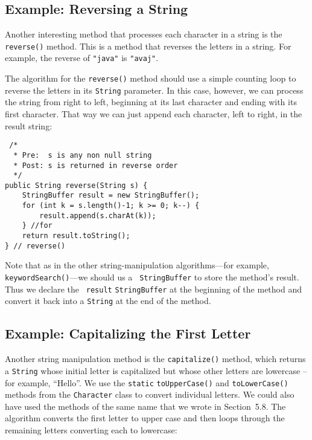 \subsection{Example: Reversing a String}
\noindent Another interesting method that processes each character in
a string is the {\tt reverse()} method. This is a method that reverses
the letters in a string. For example, the reverse of {\tt "java"} is
{\tt "avaj"}.  

The algorithm for the {\tt reverse()} method should use a simple
 counting loop to reverse the letters in
its {\tt String} parameter.  In this case, however, we can process the
string from right to left, beginning at its last character and ending
with its first character.  That way we can just append each character,
left to right, in the result string:   

\begin{jjjlisting}
\begin{lstlisting}
 /*
  * Pre:  s is any non null string
  * Post: s is returned in reverse order
  */
public String reverse(String s) {
    StringBuffer result = new StringBuffer();
    for (int k = s.length()-1; k >= 0; k--) {
        result.append(s.charAt(k));
    } //for
    return result.toString();
} // reverse()
\end{lstlisting}
\end{jjjlisting}

\noindent Note that as in the other string-manipulation
algorithms---for example, {\tt keywordSearch()}---we should us a {\tt
StringBuffer} to store the method's result.  Thus we declare the {\tt
result} {\tt StringBuffer} at the beginning of the method and convert
it back into a {\tt String} at the end of the method.


\subsection{Example: Capitalizing the First Letter }
\noindent Another string manipulation method is
the {\tt capitalize()} method, which returns a {\tt String} whose
initial letter is capitalized but whose other letters are lowercase --
for example, ``Hello''.  We use the {\tt static} {\tt toUpperCase()}
and {\tt toLowerCase()} methods from the {\tt Character} class to
convert individual letters.  We could also have used the methods of
the same name that we wrote in Section~5.8.  The algorithm converts
the first letter to upper case and then loops through the remaining
letters converting each to lowercase:

